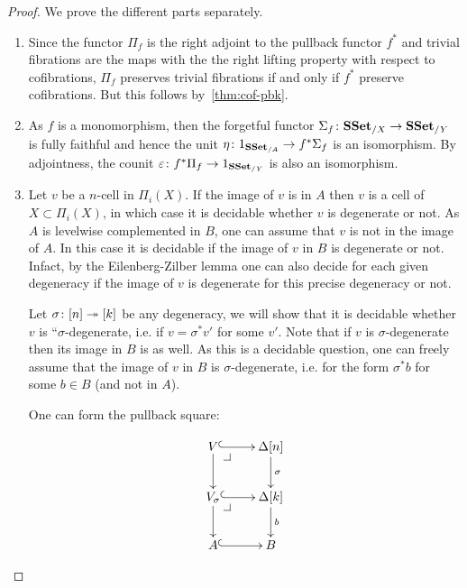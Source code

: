 \documentclass[reqno,10pt,a4paper,oneside,draft]{amsart}
\begin{document}
 
\begin{proof} We prove the different parts separately. 
\begin{enumerate}[$(i)$] 
\item 

Since the functor $\Pi_f$ is the right adjoint to the pullback functor $f^*$ and trivial fibrations are the maps with the the right lifting property with respect to cofibrations, $\Pi_f$ preserves trivial fibrations if and only if $f^*$ preserve cofibrations. But this follows by~\cref{thm:cof-pbk}.

\item As $f$ is a monomorphism, then the forgetful functor $\Sigma_{f} \colon \mathbf{SSet}_{/X} \rightarrow \mathbf{SSet}_{/Y}$ is fully faithful and hence the unit $\eta \colon 1_{\mathbf{SSet}_{/A}} \rightarrow f^* \Sigma_{f}$ is an isomorphism. By adjointness, the counit $\varepsilon \colon f^* \Pi_f \rightarrow 1_{\mathbf{SSet}_{/Y}}$ is also an isomorphism.

\item \hfill 

\begin{center}
\end{center}

Let $v$ be a $n$-cell in $\Pi_i(X)$.
If the image of $v$ is in $A$ then $v$ is a cell of $X \subset \Pi_i(X)$, in which case it is decidable whether $v$ is degenerate or not.
As $A$ is levelwise complemented in $B$, one can assume that $v$ is not in the image of $A$. In this case it is decidable if the image of $v$ in $B$ is degenerate or not.
Infact, by the Eilenberg-Zilber lemma one can also decide for each given degeneracy if the image of $v$ is degenerate for this precise degeneracy or not. 

Let $\sigma \colon [n] \twoheadrightarrow [k]$ be any degeneracy, we will show that it is decidable whether $v$ is ``$\sigma$-degenerate, i.e. if $v =\sigma^* v'$ for some $v'$. Note that if $v$ is $\sigma$-degenerate then its image in $B$ is as well. As this is a decidable question, one can freely assume that the image of $v$ in $B$ is $\sigma$-degenerate, i.e. for the form $\sigma^* b$ for some $b \in B$ (and not in $A$).

 One can form the pullback square:


\[
\xymatrix{
V \ar@{^{(}->}[r] \drpullback \ar[d] & \Delta[n] \ar@{->}[d]^{\sigma} \\
V_{\sigma} \ar@{^{(}->}[r] \drpullback \ar[d] & \Delta[k] \ar@{->}[d]^b \\
A \ar@{^{(}->}[r] &  B }
\]


\end{enumerate}
\end{proof}
\end{document}
